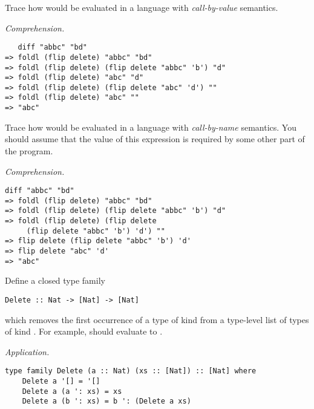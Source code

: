 \begin{parts}
\begin{subparts}
\subpart[4] \label{part:strict} Trace how  would be evaluated in a language with \emph{call-by-value} semantics. \droppoints
\begin{solution}
\emph{Comprehension.}
\begin{small}
\begin{verbatim}
   diff "abbc" "bd"
=> foldl (flip delete) "abbc" "bd"
=> foldl (flip delete) (flip delete "abbc" 'b') "d"
=> foldl (flip delete) "abc" "d"
=> foldl (flip delete) (flip delete "abc" 'd') ""
=> foldl (flip delete) "abc" ""
=> "abc"
\end{verbatim}
\end{small}
\end{solution}

\subpart[4] \label{part:lazy} Trace how  would be evaluated in a language with \emph{call-by-name} semantics. You should assume that the value of this expression is required by some other part of the program. \droppoints
\begin{solution} \emph{Comprehension.}
\begin{small}
\begin{verbatim}
diff "abbc" "bd"
=> foldl (flip delete) "abbc" "bd"
=> foldl (flip delete) (flip delete "abbc" 'b') "d"
=> foldl (flip delete) (flip delete 
     (flip delete "abbc" 'b') 'd') ""
=> flip delete (flip delete "abbc" 'b') 'd'
=> flip delete "abc" 'd'
=> "abc"
\end{verbatim}
\end{small}
\end{solution}

\subpart[4] Define a closed type family
\vspace*{0.2cm}
\begin{verbatim}
Delete :: Nat -> [Nat] -> [Nat]
\end{verbatim}
\vspace*{0.2cm}
which removes the first occurrence of a type of kind  from a type-level list of types of kind . For example,  should evaluate to . \droppoints
\begin{solution} \emph{Application.}
\begin{verbatim}
type family Delete (a :: Nat) (xs :: [Nat]) :: [Nat] where
    Delete a '[] = '[]
    Delete a (a ': xs) = xs
    Delete a (b ': xs) = b ': (Delete a xs)
\end{verbatim}
\end{solution}
\end{subparts}
\end{parts}
